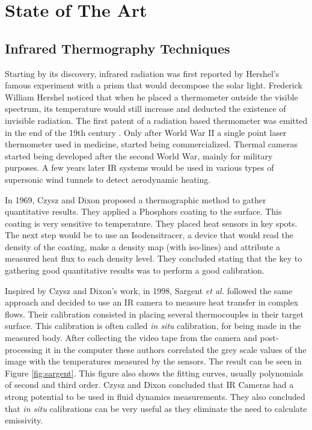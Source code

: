\section{State of The Art}
\label{sec:int_state}
\subsection{Infrared Thermography Techniques}
\par Starting by its discovery, infrared radiation was first reported by Hershel's famous experiment with a prism that would decompose the solar light. Frederick William Hershel noticed that when he placed a thermometer outside the visible spectrum, its temperature would still increase and deducted the existence of invisible radiation. The first patent of a radiation based thermometer was emitted in the end of the 19th century \cite{DeWitt1988}. Only after World War II a single point laser thermometer used in medicine, started being commercialized. Thermal cameras started being developed after the second World War, mainly for military purposes. A few years later IR systems would be used in various types of supersonic wind tunnels to detect aerodynamic heating. \\

\par In 1969, Czysz and Dixon \cite{Dixon1969} proposed a thermographic method to gather quantitative results. They applied a Phosphors coating to the surface. This coating is very sensitive to temperature. They placed heat sensors in key spots. The next step would be to use an Isodensitracer, a device that would read the density of the coating, make a density map (with iso-lines) and attribute a measured heat flux to each density level. They concluded stating that the key to gathering good quantitative results was to perform a good calibration. \\
\par Inspired by Czysz and Dixon's work, in 1998, Sargent \textit{et al.} \cite{Sargent1998} followed the same approach and decided to use an IR camera to measure heat transfer in complex flows. Their calibration consisted in placing several thermocouples in their target surface. This calibration is often called \textit{in situ} calibration, for being made in the measured body. After collecting the video tape from the camera and post-processing it in the computer these authors correlated the grey scale values of the image with the temperatures measured by the sensors. The result can be seen in Figure \ref{fig:sargent}. This figure also shows the fitting curves, usually polynomials of second and third order. Czysz and Dixon \cite{Dixon1969} concluded that IR Cameras had a strong potential to be used in fluid dynamics measurements. They also concluded that \textit{in situ } calibrations can be very useful as they eliminate the need to calculate emissivity. \\

